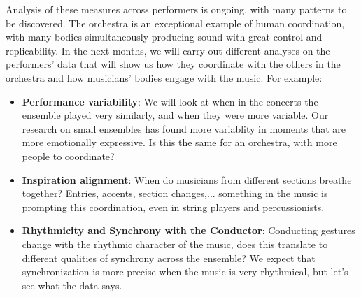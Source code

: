 Analysis of these measures across performers is ongoing, with many patterns to be discovered. The orchestra is an exceptional example of human coordination, with many bodies simultaneously producing sound with great control and replicability. In the next months, we will carry out different analyses on the performers' data that will show us how they coordinate with the others in the orchestra and how musicians' bodies engage with the music. For example: 
\begin{itemize}
\item \textbf{Performance variability}: We will look at when in the concerts the ensemble played very similarly, and when they were more variable. Our research on small ensembles has found more variablity in moments that are more emotionally expressive. Is this the same for an orchestra, with more people to coordinate?\item \textbf{Inspiration alignment}: When do musicians from different sections breathe together? Entries, accents, section changes,... something in the music is prompting this coordination, even in string players and percussionists.\item \textbf{Rhythmicity and Synchrony with the Conductor}: Conducting gestures change with the rhythmic character of the music, does this translate to different qualities of synchrony across the ensemble? We expect that synchronization is more precise when the music is very rhythmical, but let's see what the data says.
\end{itemize}

